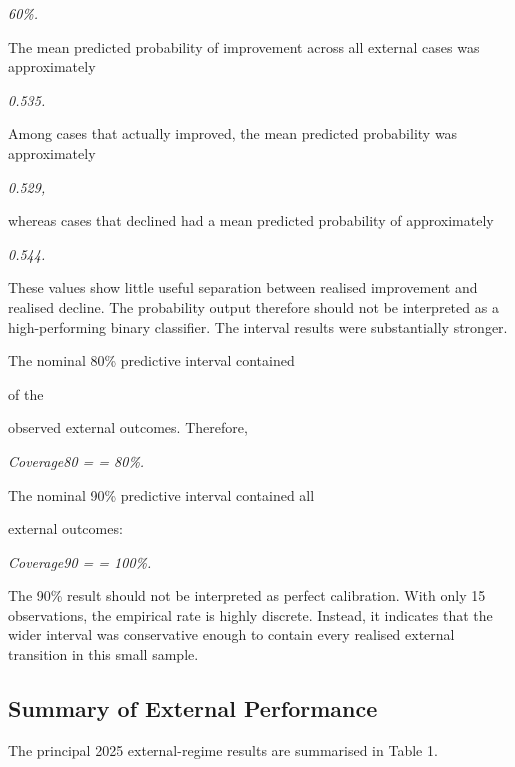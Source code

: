 \begin{center}\textit{60\%.}\end{center}

The mean predicted probability of improvement across all external cases was approximately

\begin{center}\textit{0.535.}\end{center}

Among cases that actually improved, the mean predicted probability was approximately

\begin{center}\textit{0.529,}\end{center}

whereas cases that declined had a mean predicted probability of approximately

\begin{center}\textit{0.544.}\end{center}

These values show little useful separation between realised improvement and realised decline. The probability output therefore should not be interpreted as a high-performing binary classifier. The interval results were substantially stronger.

The nominal 80\% predictive interval contained

of the

observed external outcomes. Therefore,

\begin{center}\textit{Coverage80 =        = 80\%.}\end{center}

The nominal 90\% predictive interval contained all

external outcomes:

\begin{center}\textit{Coverage90 =        = 100\%.}\end{center}

The 90\% result should not be interpreted as perfect calibration. With only 15 observations, the empirical rate is highly discrete. Instead, it indicates that the wider interval was conservative enough to contain every realised external transition in this small sample.

\subsection{Summary of External Performance}
The principal 2025 external-regime results are summarised in Table 1.

